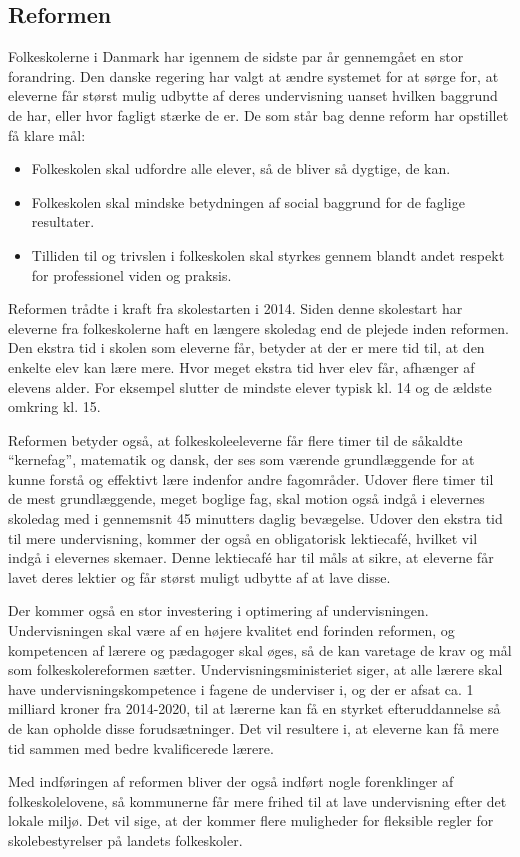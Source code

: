 \subsection{Reformen}
\label{Reformen}
Folkeskolerne i Danmark har igennem de sidste par år gennemgået en stor forandring. Den danske regering har valgt at ændre systemet for at sørge for, at eleverne får størst mulig udbytte af deres undervisning uanset hvilken baggrund de har, eller hvor fagligt stærke de er.
De som står bag denne reform har opstillet få klare mål\cite{reformenMaal}:
	\begin{itemize}
		\item Folkeskolen skal udfordre alle elever, så de bliver så dygtige, de kan.
		\item Folkeskolen skal mindske betydningen af social baggrund for de faglige resultater.
		\item Tilliden til og trivslen i folkeskolen skal styrkes gennem blandt andet respekt for professionel viden og praksis.
	\end{itemize}

Reformen trådte i kraft fra skolestarten i 2014. Siden denne skolestart har eleverne fra folkeskolerne haft en længere skoledag end de plejede inden reformen. Den ekstra tid i skolen som eleverne får, betyder at der er mere tid til, at den enkelte elev kan lære mere. Hvor meget ekstra tid hver elev får, afhænger af elevens alder. For eksempel slutter de mindste elever typisk kl. 14 og de ældste omkring kl. 15.

Reformen betyder også, at folkeskoleeleverne får flere timer til de såkaldte ``kernefag'', matematik og dansk, der ses som værende grundlæggende for at kunne forstå og effektivt lære indenfor andre fagområder. Udover flere timer til de mest grundlæggende, meget boglige fag, skal motion også indgå i elevernes skoledag med i gennemsnit 45 minutters daglig bevægelse\cite{reformenBorger}. Udover den ekstra tid til mere undervisning, kommer der også en obligatorisk lektiecafé, hvilket vil indgå i elevernes skemaer. Denne lektiecafé har til måls at sikre, at eleverne får lavet deres lektier og får størst muligt udbytte af at lave disse.

Der kommer også en stor investering i optimering af undervisningen. Undervisningen skal være af en højere kvalitet end forinden reformen, og kompetencen af lærere og pædagoger skal øges, så de kan varetage de krav og mål som folkeskolereformen sætter. Undervisningsministeriet siger, at alle lærere skal have undervisningskompetence i fagene de underviser i, og der er afsat ca. 1 milliard kroner fra 2014-2020, til at lærerne kan få en styrket efteruddannelse så de kan opholde disse forudsætninger\cite{reformenMaal}. Det vil resultere i, at eleverne kan få mere tid sammen med bedre kvalificerede lærere.

Med indføringen af reformen bliver der også indført nogle forenklinger af folkeskolelovene, så kommunerne får mere frihed til at lave undervisning efter det lokale miljø. Det vil sige, at der kommer flere muligheder for fleksible regler for skolebestyrelser på landets folkeskoler.
